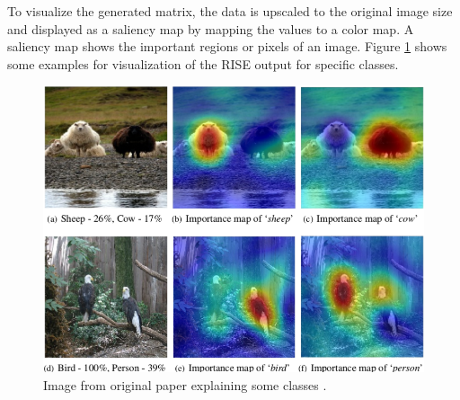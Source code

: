 To visualize the generated matrix, the data is upscaled to the original image size and displayed as a saliency map by mapping the values to a color map. A saliency map shows the important regions or pixels of an image. Figure \ref{rise_example} shows some examples for visualization of the RISE output for specific classes.

\begin{figure}[H]
\centering
\includegraphics[width=12cm]{chapters/02_methods/images/rise/sheep.png}
\caption{Image from original paper explaining some classes \cite{Petsiuk2018rise}.}
\label{rise_example}
\end{figure}
